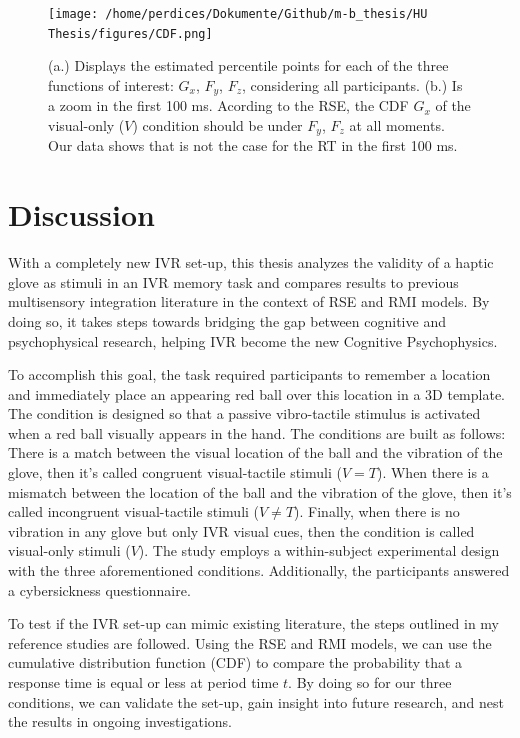 \documentclass[12pt,oneside,openright]{report}
\begin{document}
\begin{figure}[!ht]
    \centering
    \texttt{[image: /home/perdices/Dokumente/Github/m-b\_thesis/HU Thesis/figures/CDF.png]}
    \caption{ (a.) Displays the estimated percentile points for each of the three functions of interest: $G_x$, $F_y$, $F_z$, considering all participants. (b.) Is a zoom in the first 100 ms. Acording to the RSE, the CDF $G_x$ of the visual-only ($V$) condition should be under $F_y$, $F_z$ at all moments. Our data shows that is not the case for the RT in the first 100 ms.}
    \label{fig:CDF}
\end{figure}


\section*{Discussion}

With a completely new IVR set-up, this thesis analyzes the validity of a haptic glove as stimuli in an IVR memory task and compares results to previous multisensory integration literature in the context of RSE and RMI models. By doing so, it takes steps towards bridging the gap between cognitive and psychophysical research, helping IVR become the new Cognitive Psychophysics.

To accomplish this goal, the task required participants to remember a location and immediately place an appearing red ball over this location in a 3D template. The condition is designed so that a passive vibro-tactile stimulus is activated when a red ball visually appears in the hand. The conditions are built as follows: There is a match between the visual location of the ball and the vibration of the glove, then it's called congruent visual-tactile stimuli ($V=T$). When there is a mismatch between the location of the ball and the vibration of the glove, then it's called incongruent visual-tactile stimuli ($V \neq T$). Finally, when there is no vibration in any glove but only IVR visual cues, then the condition is called visual-only stimuli ($V$). The study employs a within-subject experimental design with the three aforementioned conditions. Additionally, the participants answered a cybersickness questionnaire.

To test if the IVR set-up can mimic existing literature, the steps outlined in my reference studies \parencite{Innes2019ACA, SALTAFOSSI2023108642, Ulrich2007} are followed. Using the RSE and RMI models, we can use the cumulative distribution function (CDF) to compare the probability that a response time is equal or less at period time $t$. By doing so for our three conditions, we can validate the set-up, gain insight into future research, and nest the results in ongoing investigations.
\end{document}
